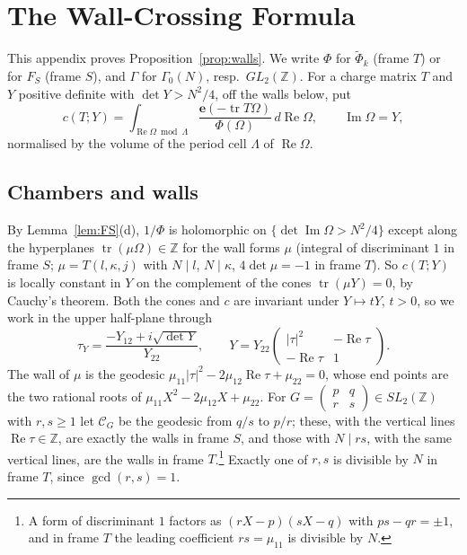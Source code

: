 \documentclass[11pt]{amsart}
\numberwithin{equation}{section}
\theoremstyle{plain}
\theoremstyle{definition}
\theoremstyle{remark}
\newcommand{\Z}{\mathbb{Z}}
\newcommand{\e}{\mathbf{e}}
\newcommand{\tPhi}{\widetilde{\Phi}}
\newcommand{\sm}[4]{\left(\begin{smallmatrix}#1&#2\\#3&#4\end{smallmatrix}\right)}
\begin{document}
\section{The Wall-Crossing Formula}\label{app:walls}

This appendix proves Proposition~\ref{prop:walls}. We write $\Phi$ for $\tPhi_k$ (frame $T$) or for $F_S$ (frame $S$), and $\Gamma$ for $\Gamma_0(N)$, resp.\ $GL_2(\Z)$. For a charge matrix $T$ and $Y$ positive definite with $\det Y>N^2/4$, off the walls below, put
\[
c(T;Y)=\int_{\operatorname{Re}\Omega\bmod\Lambda}\frac{\e(-\operatorname{tr}T\Omega)}{\Phi(\Omega)}\,d\operatorname{Re}\Omega,\qquad\operatorname{Im}\Omega=Y,
\]
normalised by the volume of the period cell $\Lambda$ of $\operatorname{Re}\Omega$.

\subsection{Chambers and walls}
By Lemma~\ref{lem:FS}(d), $1/\Phi$ is holomorphic on $\{\det\operatorname{Im}\Omega>N^2/4\}$ except along the hyperplanes $\operatorname{tr}(\mu\Omega)\in\Z$ for the wall forms $\mu$ (integral of discriminant $1$ in frame $S$; $\mu=T(l,\kappa,j)$ with $N\mid l$, $N\mid\kappa$, $4\det\mu=-1$ in frame $T$). So $c(T;Y)$ is locally constant in $Y$ on the complement of the cones $\operatorname{tr}(\mu Y)=0$, by Cauchy's theorem. Both the cones and $c$ are invariant under $Y\mapsto tY$, $t>0$, so we work in the upper half-plane through
\[
\tau_Y=\frac{-Y_{12}+i\sqrt{\det Y}}{Y_{22}},\qquad Y=Y_{22}\begin{pmatrix}|\tau|^2&-\operatorname{Re}\tau\\-\operatorname{Re}\tau&1\end{pmatrix}.
\]
The wall of $\mu$ is the geodesic $\mu_{11}|\tau|^2-2\mu_{12}\operatorname{Re}\tau+\mu_{22}=0$, whose end points are the two rational roots of $\mu_{11}X^2-2\mu_{12}X+\mu_{22}$. For $G=\sm pqrs\in SL_2(\Z)$ with $r,s\ge1$ let $\mathcal C_G$ be the geodesic from $q/s$ to $p/r$; these, with the vertical lines $\operatorname{Re}\tau\in\Z$, are exactly the walls in frame $S$, and those with $N\mid rs$, with the same vertical lines, are the walls in frame $T$.\footnote{A form of discriminant $1$ factors as $(rX-p)(sX-q)$ with $ps-qr=\pm1$, and in frame $T$ the leading coefficient $rs=\mu_{11}$ is divisible by $N$.} Exactly one of $r,s$ is divisible by $N$ in frame $T$, since $\gcd(r,s)=1$.
\end{document}
